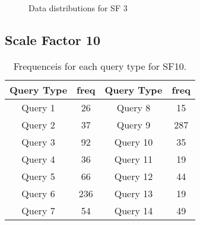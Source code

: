 \begin{figure}[H]
\begin{center}
  \caption{Data distributions for SF 3}
  \label{fig:datadistSF3}
\end{center}
\end{figure}

\subsection{Scale Factor 10}

\begin{table}[H]
\centering
    \begin{tabular}{|c|c|c|c|}
    \hline
    Query Type & freq & Query Type & freq \\ 
    \hline
    \hline
    Query 1 & 26 & Query 8 & 15 \\ 
    \hline       
    Query 2 & 37 & Query 9 & 287 \\  
    \hline        
    Query 3 & 92 & Query 10 & 35 \\ 
    \hline       
    Query 4 & 36 & Query 11 & 19 \\ 
    \hline        
    Query 5 & 66 & Query 12 & 44 \\ 
    \hline        
    Query 6 & 236 & Query 13 & 19 \\  
    \hline        
    Query 7 & 54 & Query 14 & 49 \\ 
    \hline
    \end{tabular}
    \caption{Frequenceis for each query type for SF10.}
    \label{table:freqs_sf10}
\end{table}

